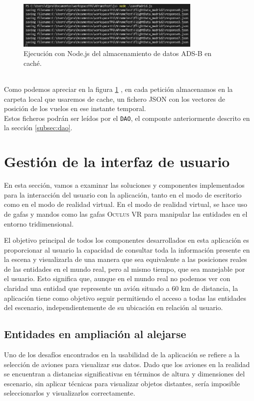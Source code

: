 \documentclass[a4paper, 11pt]{book}
\begin{document}
\begin{figure}[h]
  \centering
  \includegraphics[width=9cm, keepaspectratio]{img/captura_datos_madrid.jpg}
  \caption{Ejecución con Node.js del almacenamiento de datos ADS-B en caché.}
  \label{fig:capturaDatosCache}
\end{figure}
\\Como podemos apreciar en la figura \ref{fig:capturaDatosCache} , en cada petición almacenamos en la carpeta local que usaremos de cache, un fichero \textsc{JSON} con los vectores de posición de los vuelos en ese instante temporal.\\
Estos ficheros podrán ser leídos por el \texttt{DAO}, el componte anteriormente descrito en la sección \ref{subsec:dao}.
\clearpage
\section{Gestión de la interfaz de usuario}
\label{sec:gui}
En esta sección, vamos a examinar las soluciones y componentes implementados para la interacción del usuario con la aplicación, tanto en el modo de escritorio como en el modo de realidad virtual. En el modo de realidad virtual, se hace uso de gafas y mandos como las gafas \textsc{Oculus VR} para manipular las entidades en el entorno tridimensional.

El objetivo principal de todos los componentes desarrollados en esta aplicación es proporcionar al usuario la capacidad de consultar toda la información presente en la escena y visualizarla de una manera que sea equivalente a las posiciones reales de las entidades en el mundo real, pero al mismo tiempo, que sea manejable por el usuario. Esto significa que, aunque en el mundo real no podemos ver con claridad una entidad que represente un avión situado a 60 km de distancia, la aplicación tiene como objetivo seguir permitiendo el acceso a todas las entidades del escenario, independientemente de su ubicación en relación al usuario.
\subsection{Entidades en ampliación al alejarse}
\label{subsec:hover-scale}
Uno de los desafíos encontrados en la usabilidad de la aplicación se refiere a la selección de aviones para visualizar sus datos. Dado que los aviones en la realidad se encuentran a distancias significativas en términos de altura y dimensiones del escenario, sin aplicar técnicas para visualizar objetos distantes, sería imposible seleccionarlos y visualizarlos correctamente.
\end{document}
